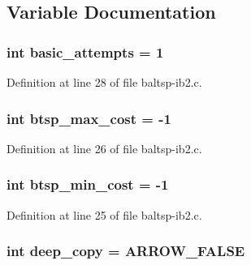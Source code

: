 \subsection{Variable Documentation}
\hypertarget{bin_2baltsp-ib2_8c_227b7ec968925f365b96a92ace419c56}{
\subsubsection[{basic\_\-attempts}]{\setlength{\rightskip}{0pt plus 5cm}int {\bf basic\_\-attempts} = 1}}
\label{bin_2baltsp-ib2_8c_227b7ec968925f365b96a92ace419c56}




Definition at line 28 of file baltsp-ib2.c.\hypertarget{bin_2baltsp-ib2_8c_8135b6557d64f65441d8f07fdc21ffdc}{
\subsubsection[{btsp\_\-max\_\-cost}]{\setlength{\rightskip}{0pt plus 5cm}int {\bf btsp\_\-max\_\-cost} = -1}}
\label{bin_2baltsp-ib2_8c_8135b6557d64f65441d8f07fdc21ffdc}




Definition at line 26 of file baltsp-ib2.c.\hypertarget{bin_2baltsp-ib2_8c_97987334c96a847ff74c2c6c83d78a73}{
\subsubsection[{btsp\_\-min\_\-cost}]{\setlength{\rightskip}{0pt plus 5cm}int {\bf btsp\_\-min\_\-cost} = -1}}
\label{bin_2baltsp-ib2_8c_97987334c96a847ff74c2c6c83d78a73}




Definition at line 25 of file baltsp-ib2.c.\hypertarget{bin_2baltsp-ib2_8c_7298da576a5b127d04b4c46b3bc78821}{
\subsubsection[{deep\_\-copy}]{\setlength{\rightskip}{0pt plus 5cm}int {\bf deep\_\-copy} = ARROW\_\-FALSE}}
\label{bin_2baltsp-ib2_8c_7298da576a5b127d04b4c46b3bc78821}




